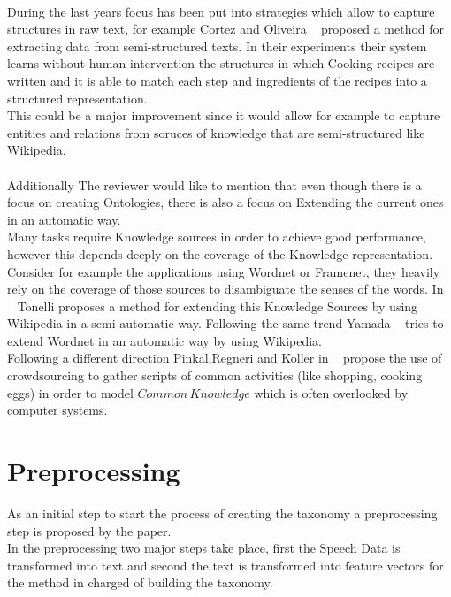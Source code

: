 \documentclass[4pt,a4paper,twocolumn]{article}
\begin{document}
\\
During the last years focus has been put into strategies which allow to capture structures in raw text, for example Cortez and Oliveira ~\cite{Cortez:2011:JUS:1989323.1989380} proposed a method for extracting data from semi-structured texts. In their experiments their system learns without human intervention the structures in which Cooking recipes are written and it is able to match each step and ingredients of the recipes into a structured representation.\\
This could be a major improvement since it would allow for example to capture entities and relations from soruces of knowledge that are semi-structured like Wikipedia.\\
\\
Additionally The reviewer would like to mention that even though there is a focus on creating Ontologies, there is also a focus on Extending the current ones in an automatic way.\\
Many tasks require Knowledge sources in order to achieve good performance, however this depends deeply on the coverage of the Knowledge representation. 
Consider for example the applications using Wordnet or Framenet, they heavily rely on the coverage of those sources to disambiguate the senses of the words.
In ~\cite{Tonelli:2013:WWM:2405838.2405917} Tonelli proposes a method for extending this Knowledge Sources by using Wikipedia in a semi-automatic way.
Following the same trend Yamada ~\cite{yamada-EtAl:2011:IJCNLP-2011} tries to extend Wordnet in an automatic way by using Wikipedia.\\
Following a different direction Pinkal,Regneri and Koller  in ~\cite{regneri-koller-pinkal:2010:ACL} propose the use of crowdsourcing to gather scripts of common activities (like shopping, cooking eggs) in order to model $Common\, Knowledge$ which is often overlooked by computer systems.


\section{Preprocessing }
As an initial step to start the process of creating the taxonomy a preprocessing step is proposed by the paper.\\
In the preprocessing two major steps take place, first the Speech Data is transformed into text and second the text is transformed into feature vectors for the method in charged of building the taxonomy.
\end{document}
